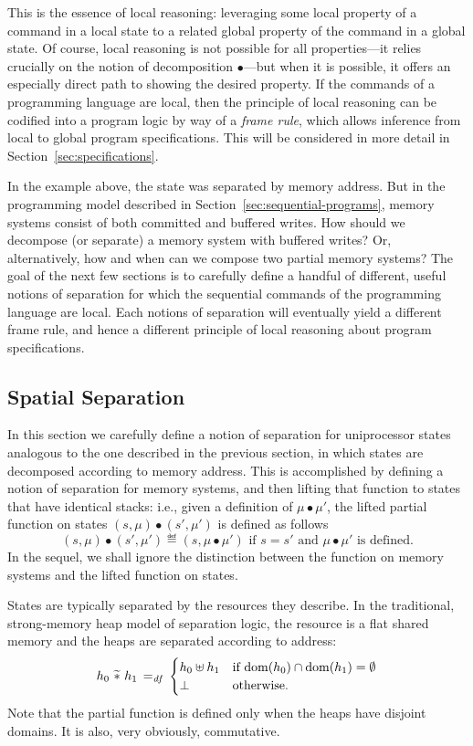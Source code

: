 \documentclass[11pt]{report}
\begin{document}
This is the essence of local reasoning: leveraging some local property of a command in a local state to a related global property of the command in a global state. Of course, local reasoning is not possible for all properties---it relies crucially on the notion of decomposition $\bullet$---but when it is possible, it offers an especially direct path to showing the desired property. If the commands of a programming language are local, then the principle of local reasoning can be codified into a program logic by way of a \emph{frame rule}, which allows inference from local to global program specifications. This will be considered in more detail in Section~\ref{sec:specifications}. 

In the example above, the state was separated by memory address. But in the programming model described in Section~\ref{sec:sequential-programs}, memory systems consist of both committed and buffered writes. How should we decompose (or separate) a memory system with buffered writes? Or, alternatively, how and when can we compose two partial memory systems? The goal of the next few sections is to carefully define a handful of different, useful notions of separation for which the sequential commands of the programming language are local. Each notions of separation will eventually yield a different frame rule, and hence a different principle of local reasoning about program specifications. 

\subsection{Spatial Separation}
\label{sec:sequential-spatial-separation}

In this section we carefully define a notion of separation for uniprocessor states analogous to the one described in the previous section, in which states are decomposed according to memory address. This is accomplished by defining a notion of separation for memory systems, and then lifting that function to states that have identical stacks: i.e., given a definition of $\mu \bullet \mu'$, the lifted partial function on states $(s,\mu) \bullet (s',\mu')$ is defined as follows \[ (s,\mu) \bullet (s',\mu') \eqdef (s,\mu \bullet \mu') \text{~if $s = s'$ and $\mu \bullet \mu'$ is defined.}\] In the sequel, we shall ignore the distinction between the function on memory systems and the lifted function on states. 

States are typically separated by the resources they describe. In the traditional, strong-memory heap model of separation logic, the resource is a flat shared memory and the heaps are separated according to address: \[ h_0 \operatorname{\,\widetilde{\ast}\,} h_1 \operatorname{\;=_{\mathit{df}}\;} \begin{cases}
    h_0 \uplus h_1 & \text{if $\operatorname{\mathrm{dom}}(h_0) \cap \operatorname{\mathrm{dom}}(h_1) = \operatorname{\emptyset}$} \\ 
    \bot & \text{otherwise.}
\end{cases}\] Note that the partial function is defined only when the heaps have disjoint domains. It is also, very obviously, commutative. 
\end{document}

